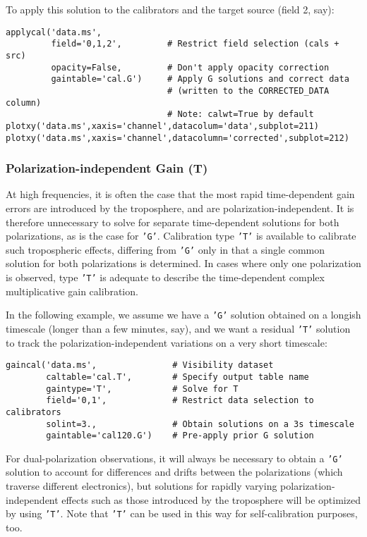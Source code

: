 To apply this solution to the calibrators and the target source (field
2, say):
\small
\begin{verbatim}
applycal('data.ms',
         field='0,1,2',         # Restrict field selection (cals + src)
         opacity=False,         # Don't apply opacity correction
         gaintable='cal.G')     # Apply G solutions and correct data
                                # (written to the CORRECTED_DATA column)
                                # Note: calwt=True by default
plotxy('data.ms',xaxis='channel',datacolum='data',subplot=211)
plotxy('data.ms',xaxis='channel',datacolumn='corrected',subplot=212)
\end{verbatim}
\normalsize

\subsubsection{Polarization-independent Gain (T)}
\label{section:cal.solve.gain.t}

At high frequencies, it is often the case that the most rapid
time-dependent gain errors are introduced by the troposphere, and are
polarization-independent.  It is therefore unnecessary to solve for
separate time-dependent solutions for both polarizations, as is the
case for {\tt 'G'}.  Calibration type {\tt 'T'} is available to calibrate such
tropospheric effects, differing from {\tt 'G'} only in that a single common
solution for both polarizations is determined.  In cases where only
one polarization is observed, type {\tt 'T'} is adequate to describe the
time-dependent complex multiplicative gain calibration.

In the following example, we assume we have a {\tt 'G'} solution obtained on
a longish timescale (longer than a few minutes, say), and we want a residual
{\tt 'T'} solution to track the polarization-independent variations on a
very short timescale:

\small
\begin{verbatim}
gaincal('data.ms',               # Visibility dataset
        caltable='cal.T',        # Specify output table name
        gaintype='T',            # Solve for T
        field='0,1',             # Restrict data selection to calibrators
        solint=3.,               # Obtain solutions on a 3s timescale
        gaintable='cal120.G')    # Pre-apply prior G solution
\end{verbatim}
\normalsize

For dual-polarization observations, it will always be necessary to
obtain a {\tt 'G'} solution to account for differences and drifts between
the polarizations (which traverse different electronics), but
solutions for rapidly varying polarization-independent effects such as
those introduced by the troposphere will be optimized by using {\tt 'T'}.
Note that {\tt 'T'} can be used in this way for self-calibration purposes,
too.

